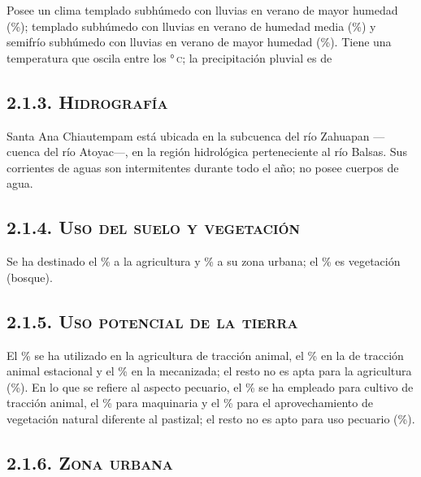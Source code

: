 \documentclass[14pt,letterpaper,twoside]{extbook} %
\begin{document}
\noindent Posee un clima templado subhúmedo con lluvias en verano de mayor humedad (\%); templado subhúmedo con lluvias en verano de humedad media (\%) y semifrío subhúmedo con lluvias en verano de mayor humedad (\%). Tiene una temperatura que oscila entre los °\,\textsc{c}; la precipitación pluvial es de 

\subsection*{\mdseries\large\textsc{2.1.3. Hidrografía}}

\noindent Santa Ana Chiautempam está ubicada en la subcuenca del río Zahuapan ---cuenca del río Atoyac---, en la región hidrológica perteneciente al río Balsas. Sus corrientes de aguas son intermitentes durante todo el año; no posee cuerpos de agua.

\subsection*{\mdseries\large\textsc{2.1.4. Uso del suelo y vegetación}}

\noindent Se ha destinado el \% a la agricultura y \% a su zona urbana; el \% es vegetación (bosque).

\subsection*{\mdseries\large\textsc{2.1.5. Uso potencial de la tierra}}

\noindent El \% se ha utilizado en la agricultura de tracción animal, el \% en la de tracción animal estacional y el \% en la mecanizada; el resto no es apta para la agricultura (\%). En lo que se refiere al aspecto pecuario, el \% se ha empleado para cultivo de tracción animal, el \% para maquinaria y el \% para el aprovechamiento de vegetación natural diferente al pastizal; el resto no es apto para uso pecuario (\%).

\subsection*{\mdseries\large\textsc{2.1.6. Zona urbana}}
\end{document}
